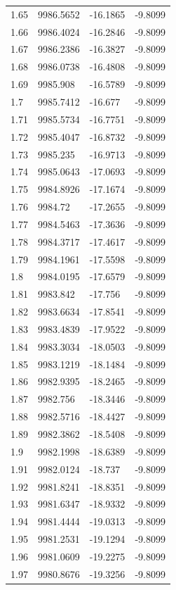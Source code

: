 \begin{table}[H]
\begin{tabular}{llll}
1.65 & 9986.5652 & -16.1865 & -9.8099 \\
1.66 & 9986.4024 & -16.2846 & -9.8099 \\
1.67 & 9986.2386 & -16.3827 & -9.8099 \\
1.68 & 9986.0738 & -16.4808 & -9.8099 \\
1.69 & 9985.908 & -16.5789 & -9.8099 \\
1.7 & 9985.7412 & -16.677 & -9.8099 \\
1.71 & 9985.5734 & -16.7751 & -9.8099 \\
1.72 & 9985.4047 & -16.8732 & -9.8099 \\
1.73 & 9985.235 & -16.9713 & -9.8099 \\
1.74 & 9985.0643 & -17.0693 & -9.8099 \\
1.75 & 9984.8926 & -17.1674 & -9.8099 \\
1.76 & 9984.72 & -17.2655 & -9.8099 \\
1.77 & 9984.5463 & -17.3636 & -9.8099 \\
1.78 & 9984.3717 & -17.4617 & -9.8099 \\
1.79 & 9984.1961 & -17.5598 & -9.8099 \\
1.8 & 9984.0195 & -17.6579 & -9.8099 \\
1.81 & 9983.842 & -17.756 & -9.8099 \\
1.82 & 9983.6634 & -17.8541 & -9.8099 \\
1.83 & 9983.4839 & -17.9522 & -9.8099 \\
1.84 & 9983.3034 & -18.0503 & -9.8099 \\
1.85 & 9983.1219 & -18.1484 & -9.8099 \\
1.86 & 9982.9395 & -18.2465 & -9.8099 \\
1.87 & 9982.756 & -18.3446 & -9.8099 \\
1.88 & 9982.5716 & -18.4427 & -9.8099 \\
1.89 & 9982.3862 & -18.5408 & -9.8099 \\
1.9 & 9982.1998 & -18.6389 & -9.8099 \\
1.91 & 9982.0124 & -18.737 & -9.8099 \\
1.92 & 9981.8241 & -18.8351 & -9.8099 \\
1.93 & 9981.6347 & -18.9332 & -9.8099 \\
1.94 & 9981.4444 & -19.0313 & -9.8099 \\
1.95 & 9981.2531 & -19.1294 & -9.8099 \\
1.96 & 9981.0609 & -19.2275 & -9.8099 \\
1.97 & 9980.8676 & -19.3256 & -9.8099 \\

\end{tabular}
\end{table}
